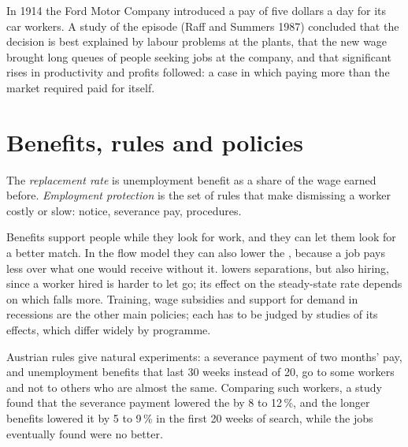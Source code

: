 \begin{record}
In 1914 the Ford Motor Company introduced a pay of five dollars a day for its car workers. A study of the episode (Raff and Summers 1987) concluded that the decision is best explained by labour
problems at the plants, that the new wage brought long queues of people seeking jobs at the company, and that significant rises in productivity and profits followed: a case in
which paying more than the market required paid for itself.
\end{record}

\section{Benefits, rules and policies}\label{sec:g11:unemployment:policies}

\begin{definition}\label{def:g11:unemployment:replacement-rate}
The \emph{replacement rate} is unemployment benefit as a share of the wage earned before. \emph{Employment protection}\label{def:g11:unemployment:employment-protection} is the set of rules that make dismissing a worker costly or slow: notice, severance pay,
procedures.
\end{definition}

Benefits support people while they look for work, and they can let them look for a better match. In the flow model they can also lower the , because a
job pays less over what one would receive without it.  lowers separations, but also hiring, since a worker hired is harder to let go; its effect on
the steady-state rate depends on which falls more. Training, wage subsidies and support for demand in recessions are the other main policies; each has to be judged by
studies of its effects, which differ widely by programme.

\begin{record}
Austrian rules give natural experiments: a severance payment of two months' pay, and unemployment benefits that last 30 weeks instead of 20, go to some workers and not to
others who are almost the same. Comparing such workers, a study found that the severance payment
lowered the  by 8 to 12\,\%, and the longer benefits lowered it by 5 to 9\,\% in the first 20 weeks of search, while the jobs eventually found were no
better.
\end{record}

